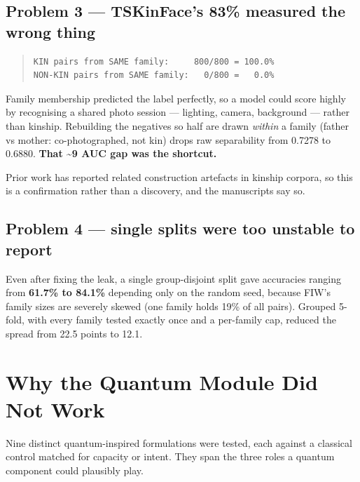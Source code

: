 \documentclass[11pt,a4paper]{article}
\begin{document}
\subsection*{Problem 3 — TSKinFace's 83\% measured the wrong thing}

\begin{quote}\small\begin{verbatim}
KIN pairs from SAME family:     800/800 = 100.0%
NON-KIN pairs from SAME family:   0/800 =   0.0%
\end{verbatim}\end{quote}


Family membership predicted the label perfectly, so a model could score highly
by recognising a shared photo session — lighting, camera, background — rather
than kinship. Rebuilding the negatives so half are drawn \emph{within} a family
(father vs mother: co-photographed, not kin) drops raw separability from 0.7278
to 0.6880. \textbf{That \textasciitilde{}9 AUC gap was the shortcut.}

Prior work has reported related construction artefacts in kinship corpora, so
this is a confirmation rather than a discovery, and the manuscripts say so.

\subsection*{Problem 4 — single splits were too unstable to report}

Even after fixing the leak, a single group-disjoint split gave accuracies
ranging from \textbf{61.7\% to 84.1\%} depending only on the random seed, because FIW's
family sizes are severely skewed (one family holds 19\% of all pairs). Grouped
5-fold, with every family tested exactly once and a per-family cap, reduced the
spread from 22.5 points to 12.1.



\section*{Why the Quantum Module Did Not Work}

Nine distinct quantum-inspired formulations were tested, each against a
classical control matched for capacity or intent. They span the three roles a
quantum component could plausibly play.
\end{document}
